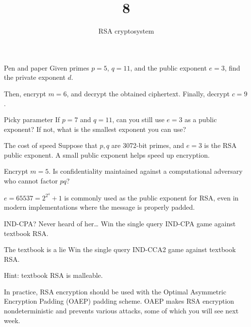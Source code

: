 \documentclass{practice}
\title{8}
\subtitle{RSA cryptosystem}
\date{\DTMdate{2024-10-30}}
\begin{document}
\maketitle

\begin{task}{Pen and paper}
  Given primes $p = 5$, $q = 11$, and the public exponent $e = 3$, find the private exponent $d$.

  Then, encrypt $m = 6$, and decrypt the obtained ciphertext.
  Finally, decrypt $c = 9$.
\end{task}

\begin{task}{Picky parameter}
  If $p = 7$ and $q = 11$, can you still use $e = 3$ as a public exponent?
  If not, what is the smallest exponent you can use?
\end{task}

\begin{task}{The cost of speed}
  Suppose that $p, q$ are 3072-bit primes, and $e = 3$ is the RSA public exponent.
  A small public exponent helps speed up encryption.

  Encrypt $m = 5$.
  Is confidentiality maintained against a computational adversary who cannot factor $pq$?

  \begin{tcolorbox}[title={$e=65537$}]
    $e = 65537 = 2^{2^4} + 1$ is commonly used as the public exponent for RSA, even in modern implementations where the message is properly padded.
  \end{tcolorbox}
\end{task}

\begin{task}{IND-CPA? Never heard of her\dots}
  Win the single query IND-CPA game against textbook RSA.
\end{task}

\begin{task}{The textbook is a lie}
  Win the single query IND-CCA2 game against textbook RSA.

  Hint: textbook RSA is malleable.
\end{task}

\begin{tcolorbox}[title=RSA-OAEP]
  In practice, RSA encryption should be used with the Optimal Asymmetric Encryption Padding (OAEP) padding scheme.
  OAEP makes RSA encryption nondeterministic and prevents various attacks, some of which you will see next week.
\end{tcolorbox}
\end{document}
